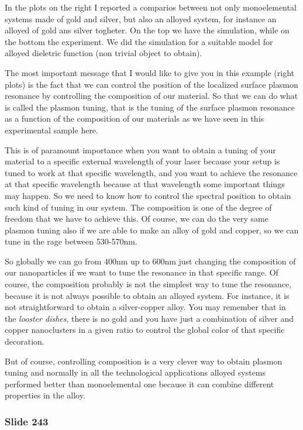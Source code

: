 \documentclass[../main/main.tex]{subfiles}
\begin{document}
In the plots on the right I reported a comparios between not only monoelemental systems made of gold and silver, but also an alloyed system, for instance an alloyed of gold ans silver togheter. On the top we have the simulation, while on the bottom the experiment. We did the simulation for a suitable model for alloyed dieletric function (non trivial object to obtain).

The most important message that I would like to give you in this example (right plots) is the fact that we can control the position of the localized surface plasmon resonance by controlling the composition of our material. So that we can do what is called the plasmon tuning, that is the tuning of the surface plasmon resonance as a function of the composition of our materials as we have seen in this experimental sample here.

This is of paramount importance when you want to obtain a tuning of your material to a specific external wavelength of your laser because your setup is tuned to work at that specific wavelength, and you want to achieve the resonance at that specific wavelength because at that wavelength some important things may happen.
So we need to know how to control the spectral position to obtain such kind of tuning in our system. The composition is one of the degree of freedom that we have to achieve this. Of course, we can do the very same plasmon tuning also if we are able to make an alloy of gold and copper, so we can tune in the rage between 530-570nm.

So globally we can go from 400nm up to 600nm just changing the composition of our nanoparticles if we want to tune the resonance in that specific range.
Of course, the composition probably is not the simplest way to tune the resonance, because it is not always possible to obtain an alloyed system. For instance, it is not straightforward to obtain a silver-copper alloy. You may remember that in the \emph{looster dishes}, there is no gold and you have just a combination of silver and copper nanoclusters in a given ratio to control the global color of that specific decoration.

But of course, controlling composition is a very clever way to obtain plasmon tuning and normally in all the technological applications alloyed systems performed better than monoelemental one because it can combine different properties in the alloy.

\newpage

\subsubsection{Slide 243}
\end{document}
